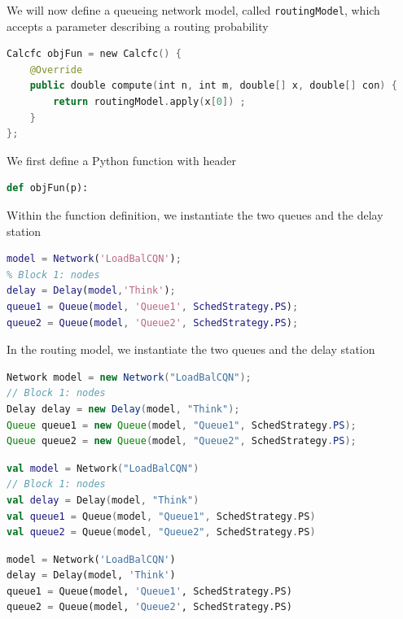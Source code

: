 \begin{KOTLIN}
We will now define a queueing network model, called \texttt{routingModel}, which accepts a parameter describing a routing probability
\begin{lstlisting}[language=kotlin, basicstyle=\ttfamily\scriptsize]
Calcfc objFun = new Calcfc() {
    @Override
    public double compute(int n, int m, double[] x, double[] con) {
        return routingModel.apply(x[0]) ;
    }
};
\end{lstlisting}
\end{KOTLIN}
\begin{PYTHON}
We first define a Python function with header
\begin{lstlisting}[language = python]
def objFun(p):
\end{lstlisting}
\end{PYTHON}
Within the function definition, we instantiate the two queues and the delay station
\begin{MATLAB}
\begin{lstlisting}[language = matlab]
model = Network('LoadBalCQN');
% Block 1: nodes
delay = Delay(model,'Think');
queue1 = Queue(model, 'Queue1', SchedStrategy.PS);
queue2 = Queue(model, 'Queue2', SchedStrategy.PS);
\end{lstlisting}
\end{MATLAB}
\begin{JAVA}
In the routing model, we instantiate the two queues and the delay station
\begin{lstlisting}[language = java, basicstyle=\ttfamily\scriptsize]
Network model = new Network("LoadBalCQN");
// Block 1: nodes
Delay delay = new Delay(model, "Think");
Queue queue1 = new Queue(model, "Queue1", SchedStrategy.PS);
Queue queue2 = new Queue(model, "Queue2", SchedStrategy.PS);
\end{lstlisting}
\end{JAVA}
\begin{KOTLIN}
\begin{lstlisting}[language = kotlin, basicstyle=\ttfamily\scriptsize]
val model = Network("LoadBalCQN")
// Block 1: nodes
val delay = Delay(model, "Think")
val queue1 = Queue(model, "Queue1", SchedStrategy.PS)
val queue2 = Queue(model, "Queue2", SchedStrategy.PS)
\end{lstlisting}
\end{KOTLIN}
\begin{PYTHON}
\begin{lstlisting}[language = python]
model = Network('LoadBalCQN')
delay = Delay(model, 'Think')
queue1 = Queue(model, 'Queue1', SchedStrategy.PS)
queue2 = Queue(model, 'Queue2', SchedStrategy.PS)
\end{lstlisting}
\end{PYTHON}
